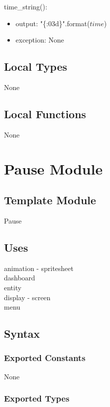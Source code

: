 \documentclass[12pt]{article}
\begin{document}
\noindent time\_string():
\begin{itemize}
    \item output: "\{:03d\}".format($time$)
    
    \item exception: None
\end{itemize}

\subsection* {Local Types}

None

\subsection* {Local Functions}

None

\newpage

\section* {Pause Module}

\subsection*{Template Module}

Pause

\subsection *{Uses}

animation - spritesheet \\
dashboard \\
entity \\
display - screen \\
menu \\

\subsection* {Syntax}

\subsubsection* {Exported Constants}

None

\subsubsection* {Exported Types}
\end{document}
